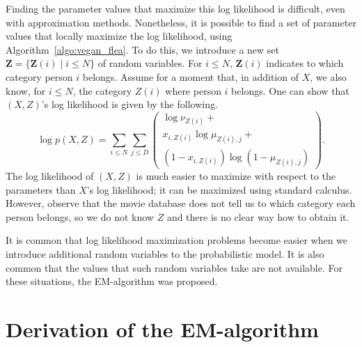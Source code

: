 Finding the parameter values that maximize this log likelihood is difficult, even with approximation methods. Nonetheless, it is possible to find a set of parameter values that locally maximize the log likelihood, using Algorithm~\ref{algo:vegan_flea}. To do this, we introduce a new set $\mathbf{Z} = \{\mathbf{Z}(i) \mid i \leq N\}$ of random variables. For $i \leq N$, $\mathbf{Z}(i)$ indicates to which category person $i$ belongs. Assume for a moment that, in addition of $X$, we also know, for $i \leq N$, the category $Z(i)$ where person $i$ belongs. One can show that $(X, Z)$'s log likelihood is given by the following.
%
\begin{equation}
\log p(X, Z) = \sum_{i \leq N}\sum_{j \leq D} \left( 
\begin{array}{l}
\log \nu_{Z(i)} + \\ 
x_{i,Z(i)}\log {\mu_{Z(i), j}} + \\
\left(1 - x_{i, Z(i)}\right)\log \left(1 - \mu_{Z(i),j}\right)
\end{array}\right).
\label{eq:log_complete_likelihood}
\end{equation}
%
The log likelihood of $(X, Z)$ is much easier to maximize with respect to the parameters than $X$'s log likelihood; it can be maximized using standard calculus. However, observe that the movie database does not tell us to which category each person belongs, so we do not know $Z$ and there is no clear way how to obtain it.

It is common that log likelihood maximization problems become easier when we introduce additional random variables to the probabilistic model. It is also common that the values that such random variables take are not available. For these situations, the EM-algorithm was proposed.

\section{Derivation of the EM-algorithm}
\label{sec:em_algo}

